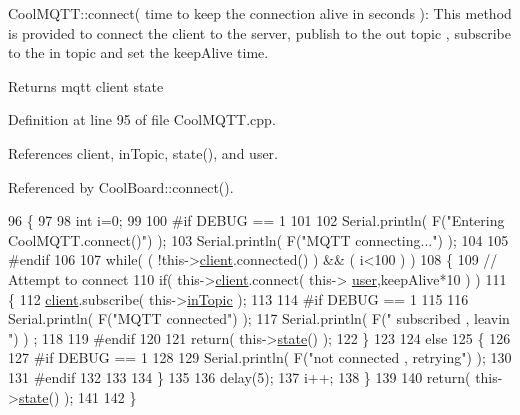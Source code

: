 Cool\+M\+Q\+T\+T\+::connect( time to keep the connection alive in seconds )\+: This method is provided to connect the client to the server, publish to the out topic , subscribe to the in topic and set the keep\+Alive time.

\begin{DoxyReturn}{Returns}
mqtt client state 
\end{DoxyReturn}


Definition at line 95 of file Cool\+M\+Q\+T\+T.\+cpp.



References client, in\+Topic, state(), and user.



Referenced by Cool\+Board\+::connect().


\begin{DoxyCode}
96 \{       
97 
98     \textcolor{keywordtype}{int} i=0;
99 
100 \textcolor{preprocessor}{#if DEBUG == 1 }
101 
102     Serial.println( F(\textcolor{stringliteral}{"Entering CoolMQTT.connect()"}) );
103     Serial.println( F(\textcolor{stringliteral}{"MQTT connecting..."}) );
104 
105 \textcolor{preprocessor}{#endif}
106     
107     \textcolor{keywordflow}{while}( ( !this->\hyperlink{classCoolMQTT_a4ca71e4f76ef868692a297efd45b1415}{client}.connected() ) && ( i<100 ) ) 
108     \{
109         \textcolor{comment}{// Attempt to connect}
110         \textcolor{keywordflow}{if}( this->\hyperlink{classCoolMQTT_a4ca71e4f76ef868692a297efd45b1415}{client}.connect( this-> \hyperlink{classCoolMQTT_a8cd47e45d457f908d4b4390b35aaee83}{user},keepAlive*10  ) )
111         \{
112             \hyperlink{classCoolMQTT_a4ca71e4f76ef868692a297efd45b1415}{client}.subscribe( this->\hyperlink{classCoolMQTT_a4492f52a441e83cc5151010317fdb52d}{inTopic} );
113 
114 \textcolor{preprocessor}{        #if DEBUG == 1 }
115 
116             Serial.println( F(\textcolor{stringliteral}{"MQTT connected"}) );
117             Serial.println( F(\textcolor{stringliteral}{" subscribed , leavin "}) ) ;
118         
119 \textcolor{preprocessor}{        #endif}
120 
121             \textcolor{keywordflow}{return}( this->\hyperlink{classCoolMQTT_a5d003307eff78efbd585e42b43b72b6d}{state}() );
122         \}
123 
124         \textcolor{keywordflow}{else}
125         \{
126         
127 \textcolor{preprocessor}{        #if DEBUG == 1 }
128 
129             Serial.println( F(\textcolor{stringliteral}{"not connected , retrying"}) );
130         
131 \textcolor{preprocessor}{        #endif}
132 
133             
134         \}
135 
136     delay(5);
137     i++;
138     \}
139     
140     \textcolor{keywordflow}{return}( this->\hyperlink{classCoolMQTT_a5d003307eff78efbd585e42b43b72b6d}{state}() );
141 
142 \}
\end{DoxyCode}
